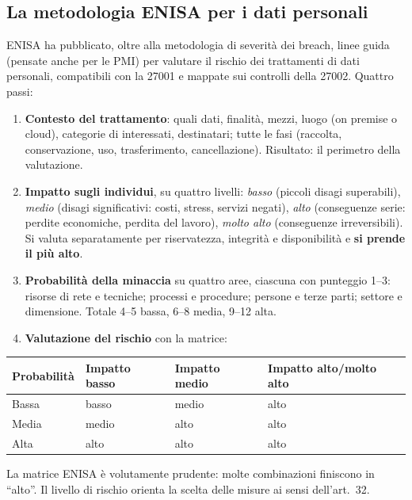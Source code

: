 \subsection{La metodologia ENISA per i dati personali}
ENISA ha pubblicato, oltre alla metodologia di severità dei breach, linee guida (pensate anche per le PMI)
per valutare il rischio dei trattamenti di dati personali, compatibili con la 27001 e mappate sui controlli
della 27002. Quattro passi:
\begin{enumerate}
  \item \textbf{Contesto del trattamento}: quali dati, finalità, mezzi, luogo (on premise o cloud), categorie
    di interessati, destinatari; tutte le fasi (raccolta, conservazione, uso, trasferimento, cancellazione).
    Risultato: il perimetro della valutazione.
  \item \textbf{Impatto sugli individui}, su quattro livelli: \emph{basso} (piccoli disagi superabili),
    \emph{medio} (disagi significativi: costi, stress, servizi negati), \emph{alto} (conseguenze serie: perdite
    economiche, perdita del lavoro), \emph{molto alto} (conseguenze irreversibili). Si valuta separatamente
    per riservatezza, integrità e disponibilità e \textbf{si prende il più alto}.
  \item \textbf{Probabilità della minaccia} su quattro aree, ciascuna con punteggio 1--3: risorse di rete e
    tecniche; processi e procedure; persone e terze parti; settore e dimensione. Totale 4--5 bassa, 6--8
    media, 9--12 alta.
  \item \textbf{Valutazione del rischio} con la matrice:
\end{enumerate}
\begin{center}
\small
\begin{tabular}{llll}
\toprule
\textbf{Probabilità} & \textbf{Impatto basso} & \textbf{Impatto medio} & \textbf{Impatto alto/molto alto}\\
\midrule
Bassa & basso & medio & alto\\
Media & medio & alto & alto\\
Alta & alto & alto & alto\\
\bottomrule
\end{tabular}
\end{center}
\noindent La matrice ENISA è volutamente prudente: molte combinazioni finiscono in ``alto''. Il livello di
rischio orienta la scelta delle misure ai sensi dell'art.~32.

